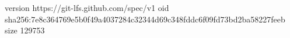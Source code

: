 version https://git-lfs.github.com/spec/v1
oid sha256:7e8c364769e5b0f49a4037284c32344d69c348fddc6f09fd73bd2ba58227feeb
size 129753

